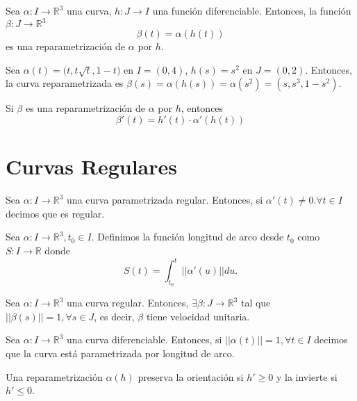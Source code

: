 \begin{defn}[Reparametrización]
  Sea $\alpha: I \to \mathbb{R}^{3}$ una curva, $h: J \to I$ una función diferenciable. Entonces, la función $\beta: J \to \mathbb{R}^{3}$
  \[ 
    \beta(t) = \alpha(h(t)) 
  \] 
  es una reparametrización de $\alpha$ por $h$.
\end{defn}

\begin{ejm}
  Sea $\alpha(t) = \big ( t , t \sqrt{t}, 1-t \big )$ en $I = (0,4)$, $h(s) = s^{2}$ en $J = ( 0,2 )$. Entonces, la curva reparametrizada es $\beta(s) = \alpha(h(s)) = \alpha(s^{2}) = ( s, s^{3}, 1 -s^{2} )$.
\end{ejm}

\begin{lem}
  Si $\beta$ es una reparametrización de $\alpha$ por $h$, entonces
  \[ 
    \beta'(t) = h'(t)\cdot \alpha'(h(t)) 
  \] 
\end{lem}

\section{Curvas Regulares}

\begin{defn}
  Sea $\alpha: I \to \mathbb{R}^{3}$ una curva parametrizada regular. Entonces, si $\alpha'(t) \neq 0. \forall t \in I$ decimos que es regular.
\end{defn}


\begin{defn}
  Sea $\alpha : I \to \mathbb{R}^{3}, t_{0} \in I$. Definimos la función longitud de arco desde $t_{0}$ como $S: I \to \mathbb{R}$ donde
  \[ 
    S(t) = \int_{t_{0}}^{t}  ||\alpha ' (u)|| du. 
  \] 
\end{defn}

\begin{theo}
  Sea $\alpha: I \to \mathbb{R}^{3}$ una curva regular. Entonces, $\exists \beta: J \to \mathbb{R}^{3}$ tal que $||\beta(s)||=1, \forall s \in J$, es decir, $\beta$ tiene velocidad unitaria.
\end{theo}

\begin{defn}
  Sea $\alpha: I \to \mathbb{R}^{3}$ una curva diferenciable. Entonces, si $||\alpha(t)|| = 1, \forall t \in I$ decimos que la curva está parametrizada por longitud de arco.
\end{defn}

\begin{obs}
  Una reparametrización $\alpha(h)$ preserva la orientación si $h' \geq 0$ y la invierte si $h' \leq 0$.
\end{obs}

